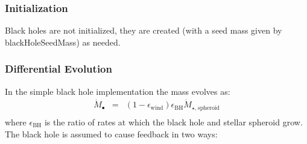\subsubsection{Initialization}

Black holes are not initialized, they are created (with a seed mass given by {\normalfont \ttfamily blackHoleSeedMass}) as needed.

\subsubsection{Differential Evolution}

In the simple black hole implementation the mass evolves as:
\begin{eqnarray}
\dot{M}_\bullet &=& (1-\epsilon_\mathrm{wind}) \epsilon_\mathrm{BH} \dot{M}_{\star,s\mathrm{pheroid}} \\
\end{eqnarray}
where $\epsilon_\mathrm{BH}$ is the ratio of rates at which the black hole and stellar spheroid grow. The black hole is assumed to cause feedback in two ways:
